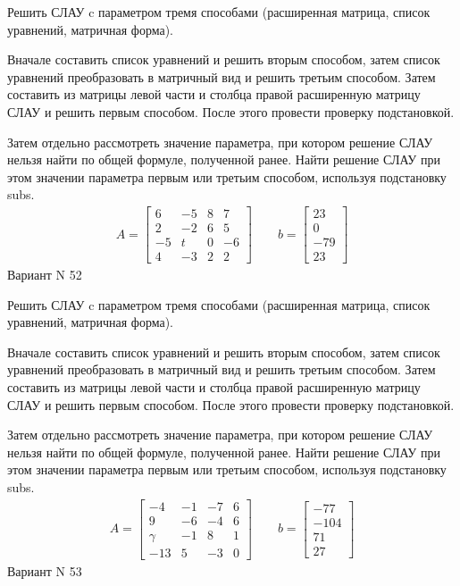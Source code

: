 \documentclass[11pt]{report}
\begin{document}
Решить СЛАУ c параметром тремя способами (расширенная матрица, список уравнений, матричная форма).

Вначале составить список уравнений и решить вторым способом,
затем список уравнений преобразовать в матричный вид и решить третьим способом.
Затем составить из матрицы левой части и столбца правой расширенную матрицу СЛАУ и решить первым способом.
После этого провести проверку подстановкой.

Затем отдельно рассмотреть значение параметра, при котором решение СЛАУ нельзя найти по общей формуле,
полученной ранее.
Найти решение СЛАУ при этом значении параметра первым или третьим способом, используя подстановку subs.
\begin{align*}
    A = \left[\begin{matrix}6 & -5 & 8 & 7\\2 & -2 & 6 & 5\\-5 & t & 0 & -6\\4 & -3 & 2 & 2\end{matrix}\right]
\qquad b = \left[\begin{matrix}23\\0\\-79\\23\end{matrix}\right]
\end{align*}
\newpage
Вариант N 52


Решить СЛАУ c параметром тремя способами (расширенная матрица, список уравнений, матричная форма).

Вначале составить список уравнений и решить вторым способом,
затем список уравнений преобразовать в матричный вид и решить третьим способом.
Затем составить из матрицы левой части и столбца правой расширенную матрицу СЛАУ и решить первым способом.
После этого провести проверку подстановкой.

Затем отдельно рассмотреть значение параметра, при котором решение СЛАУ нельзя найти по общей формуле,
полученной ранее.
Найти решение СЛАУ при этом значении параметра первым или третьим способом, используя подстановку subs.
\begin{align*}
    A = \left[\begin{matrix}-4 & -1 & -7 & 6\\9 & -6 & -4 & 6\\\gamma & -1 & 8 & 1\\-13 & 5 & -3 & 0\end{matrix}\right]
\qquad b = \left[\begin{matrix}-77\\-104\\71\\27\end{matrix}\right]
\end{align*}
\newpage
Вариант N 53
\end{document}
